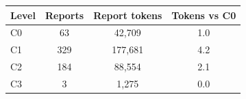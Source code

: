 \begin{tabular}{lccc}
\toprule
Level & Reports & Report tokens & Tokens vs C0 \\
\midrule
C0 & 63 & 42,709 & 1.0 \\
C1 & 329 & 177,681 & 4.2 \\
C2 & 184 & 88,554 & 2.1 \\
C3 & 3 & 1,275 & 0.0 \\
\bottomrule
\end{tabular}
